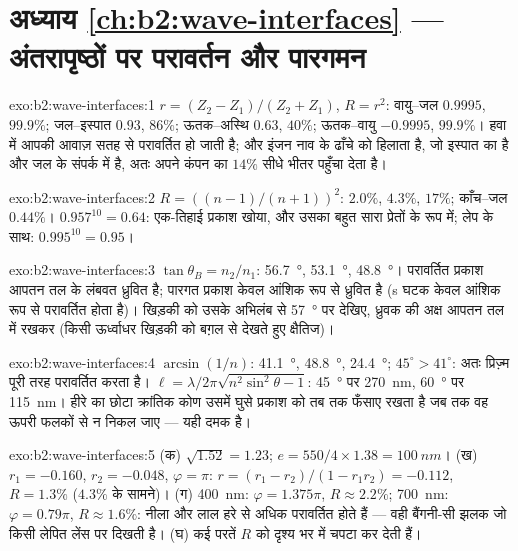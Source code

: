 \section*{अध्याय \ref{ch:b2:wave-interfaces} --- अंतरापृष्ठों पर परावर्तन और पारगमन}

\begin{solution}{exo:b2:wave-interfaces:1}
$r = (Z_2 - Z_1)/(Z_2 + Z_1)$, $R = r^2$: वायु--जल $0.9995$, $99.9\%$;
जल--इस्पात $0.93$, $86\%$; ऊतक--अस्थि $0.63$, $40\%$; ऊतक--वायु
$-0.9995$, $99.9\%$। हवा में आपकी आवाज़ सतह से परावर्तित हो जाती है; और
इंजन नाव के ढाँचे को हिलाता है, जो इस्पात का है और जल के संपर्क में है, अतः
अपने कंपन का $14\%$ सीधे भीतर पहुँचा देता है।
\end{solution}

\begin{solution}{exo:b2:wave-interfaces:2}
$R = ((n - 1)/(n + 1))^2$: $2.0\%$, $4.3\%$, $17\%$; काँच--जल $0.44\%$।
$0.957^{10} = 0.64$: एक-तिहाई प्रकाश खोया, और उसका बहुत सारा प्रेतों के रूप में;
लेप के साथ: $0.995^{10} = 0.95$।
\end{solution}

\begin{solution}{exo:b2:wave-interfaces:3}
$\tan\theta_B = n_2/n_1$: \qty{56.7}{\degree}, \qty{53.1}{\degree}, \qty{48.8}{\degree}। परावर्तित
प्रकाश आपतन तल के लंबवत ध्रुवित है;
पारगत प्रकाश केवल आंशिक रूप से ध्रुवित है (s घटक
केवल आंशिक रूप से परावर्तित होता है)। खिड़की को उसके अभिलंब से \qty{57}{\degree} पर
देखिए, ध्रुवक की अक्ष आपतन तल में रखकर (किसी ऊर्ध्वाधर खिड़की को
बग़ल से देखते हुए क्षैतिज)।
\end{solution}

\begin{solution}{exo:b2:wave-interfaces:4}
$\arcsin(1/n)$: \qty{41.1}{\degree}, \qty{48.8}{\degree}, \qty{24.4}{\degree}; $45^\circ > 41^\circ$:
अतः प्रिज़्म पूरी तरह परावर्तित करता है। $\ell = \lambda/2\pi\sqrt{n^2\sin^2\theta - 1}$: \qty{45}{\degree} पर
\qty{270}{nm}, \qty{60}{\degree} पर \qty{115}{nm}। हीरे का छोटा क्रांतिक कोण
उसमें घुसे प्रकाश को तब तक फँसाए रखता है जब तक वह ऊपरी फलकों से न निकल जाए ---
यही दमक है।
\end{solution}

\begin{solution}{exo:b2:wave-interfaces:5}
(क) $\sqrt{1.52} = 1.23$; $e = 550/4 \times 1.38 = \qty{100}{nm}$। (ख) $r_1 = -0.160$, $r_2 =
-0.048$, $\varphi = \pi$: $r = (r_1 - r_2)/(1 - r_1r_2) = -0.112$, $R = 1.3\%$ ($4.3\%$ के
सामने)। (ग) \qty{400}{nm}: $\varphi = 1.375\pi$, $R \approx 2.2\%$; \qty{700}{nm}: $\varphi =
0.79\pi$, $R \approx 1.6\%$: नीला और लाल हरे से अधिक परावर्तित होते हैं ---
वही बैंगनी-सी झलक जो किसी लेपित लेंस पर दिखती है। (घ) कई परतें $R$ को
दृश्य भर में चपटा कर देती हैं।
\end{solution}

